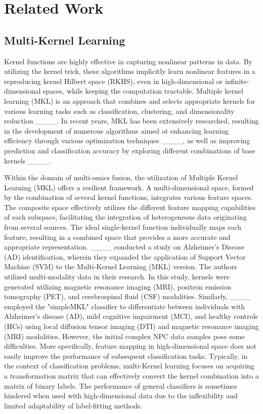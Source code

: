 \section{Related Work}
\subsection{Multi-Kernel Learning}
Kernel functions are highly effective in capturing nonlinear patterns in data. By utilizing the kernel trick, these algorithms implicitly learn nonlinear features in a reproducing kernel Hilbert space (RKHS), even in high-dimensional or infinite-dimensional spaces, while keeping the computation tractable. Multiple kernel learning (MKL) is an approach that combines and selects appropriate kernels for various learning tasks such as classification, clustering, and dimensionality reduction ____. In recent years, MKL has been extensively researched, resulting in the development of numerous algorithms aimed at enhancing learning efficiency through various optimization techniques ____, as well as improving prediction and classification accuracy by exploring different combinations of base kernels ____.


Within the domain of multi-omics fusion, the utilization of Multiple Kernel Learning (MKL) offers a resilient framework. A multi-dimensional space, formed by the combination of several kernel functions, integrates various feature spaces. The composite space effectively utilizes the different feature mapping capabilities of each subspace, facilitating the integration of heterogeneous data originating from several sources. The ideal single-kernel function individually maps each feature, resulting in a combined space that provides a more accurate and appropriate representation. ____ conducted a study on Alzheimer's Disease (AD) identification, wherein they expanded the application of Support Vector Machine (SVM) to the Multi-Kernel Learning (MKL) version. The authors utilized multi-modality data in their research. In this study, kernels were generated utilizing magnetic resonance imaging (MRI), positron emission tomography (PET), and cerebrospinal fluid (CSF) modalities. Similarly, ____ employed the "simpleMKL" classifier  to differentiate between individuals with Alzheimer's disease (AD), mild cognitive impairment (MCI), and healthy controls (HCs) using local diffusion tensor imaging (DTI) and magnetic resonance imaging (MRI) modalities. 
However, the initial complex NPC data samples pose some difficulties. More specifically, feature mapping in high-dimensional space does not easily improve the performance of subsequent classification tasks. Typically, in the context of classification problems, multi-Kernel learning focuses on acquiring a transformation matrix that can effectively convert the kernel combination into a matrix of binary labels. The performance of general classifiers is sometimes hindered when used with high-dimensional data due to the inflexibility and limited adaptability of label-fitting methods.


